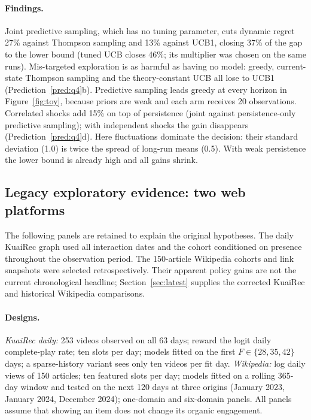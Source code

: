 \documentclass[11pt]{article}
\theoremstyle{definition}
\theoremstyle{remark}
\begin{document}
\paragraph{Findings.} Joint predictive sampling, which has no tuning parameter, cuts dynamic regret 27\% against Thompson sampling and 13\% against UCB1, closing 37\% of the gap to the lower bound (tuned UCB closes 46\%; its multiplier was chosen on the same runs). Mis-targeted exploration is as harmful as having no model: greedy, current-state Thompson sampling and the theory-constant UCB all lose to UCB1 (Prediction~\ref{pred:q4}b). Predictive sampling leads greedy at every horizon in Figure~\ref{fig:toy}, because priors are weak and each arm receives 20 observations. Correlated shocks add 15\% on top of persistence (joint against persistence-only predictive sampling); with independent shocks the gain disappears (Prediction~\ref{pred:q4}d). Here fluctuations dominate the decision: their standard deviation (1.0) is twice the spread of long-run means (0.5). With weak persistence the lower bound is already high and all gains shrink.

\subsection{Legacy exploratory evidence: two web platforms}

The following panels are retained to explain the original hypotheses. The daily KuaiRec graph used all interaction dates and the cohort conditioned on presence throughout the observation period. The 150-article Wikipedia cohorts and link snapshots were selected retrospectively. Their apparent policy gains are not the current chronological headline; Section~\ref{sec:latest} supplies the corrected KuaiRec and historical Wikipedia comparisons.

\paragraph{Designs.} \emph{KuaiRec daily:} 253 videos observed on all 63 days; reward the logit daily complete-play rate; ten slots per day; models fitted on the first $F\in\{28,35,42\}$ days; a sparse-history variant sees only ten videos per fit day. \emph{Wikipedia:} log daily views of 150 articles; ten featured slots per day; models fitted on a rolling 365-day window and tested on the next 120 days at three origins (January 2023, January 2024, December 2024); one-domain and six-domain panels. All panels assume that showing an item does not change its organic engagement.
\end{document}
